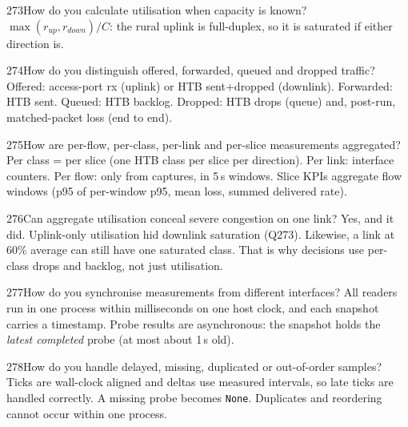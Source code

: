\begin{qa}{273}{How do you calculate utilisation when capacity is known?}
$\max(r_{up},r_{down})/C$: the rural uplink is full-duplex, so it is saturated if either direction is.
\end{qa}

\begin{qa}{274}{How do you distinguish offered, forwarded, queued and dropped traffic?}
Offered: access-port rx (uplink) or HTB sent+dropped (downlink). Forwarded: HTB sent. Queued: HTB backlog.
Dropped: HTB drops (queue) and, post-run, matched-packet loss (end to end).
\end{qa}

\begin{qa}{275}{How are per-flow, per-class, per-link and per-slice measurements aggregated?}
Per class = per slice (one HTB class per slice per direction). Per link: interface counters. Per flow: only from
captures, in 5\,s windows. Slice KPIs aggregate flow windows (p95 of per-window p95, mean loss, summed delivered
rate).
\end{qa}

\begin{qa}{276}{Can aggregate utilisation conceal severe congestion on one link?}
Yes, and it did. Uplink-only utilisation hid downlink saturation (Q273). Likewise, a link at 60\% average can still
have one saturated class. That is why decisions use per-class drops and backlog, not just utilisation.
\end{qa}

\begin{qa}{277}{How do you synchronise measurements from different interfaces?}
All readers run in one process within milliseconds on one host clock, and each snapshot carries a timestamp.
Probe results are asynchronous: the snapshot holds the \emph{latest completed} probe (at most about 1\,s old).
\end{qa}

\begin{qa}{278}{How do you handle delayed, missing, duplicated or out-of-order samples?}
Ticks are wall-clock aligned and deltas use measured intervals, so late ticks are handled correctly. A missing probe
becomes \texttt{None}. Duplicates and reordering cannot occur within one process.
\end{qa}

